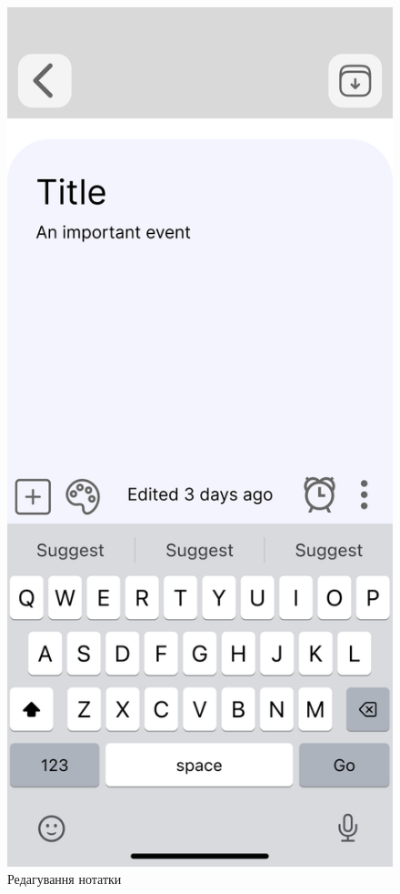 \documentclass[oneside,14pt]{extarticle}
\begin{document}
\begin{normalsize}
	\begin{figure}[H]
		\begin{minipage}{0.48\textwidth}
			\centering
			\includegraphics[scale=0.13]{Frame 9}
			\caption{Редагування нотатки}

\end{minipage}
\end{figure}
\end{normalsize}
\end{document}
